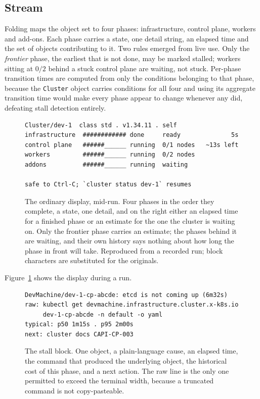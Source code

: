 \documentclass[conference]{IEEEtran}
\begin{document}
\subsection{Stream}
\label{sec:stream}

Folding maps the object set to four phases: infrastructure, control plane, workers
and add-ons. Each phase carries a state, one detail string, an elapsed time and
the set of objects contributing to it. Two rules emerged from live use. Only the
\emph{frontier} phase, the earliest that is not done, may be marked stalled;
workers sitting at $0/2$ behind a stuck control plane are waiting, not stuck.
Per-phase transition times are computed from only the conditions belonging to that
phase, because the \texttt{Cluster} object carries conditions for all four and
using its aggregate transition time would make every phase appear to change
whenever any did, defeating stall detection entirely.

\begin{figure}[t]
\begin{lstlisting}
Cluster/dev-1  class std . v1.34.11 . self
infrastructure  ############ done     ready              5s
control plane   ######______ running  0/1 nodes   ~13s left
workers         ######______ running  0/2 nodes
addons          ######______ running  waiting

safe to Ctrl-C; `cluster status dev-1` resumes
\end{lstlisting}
\caption{The ordinary display, mid-run. Four phases in the order they complete, a
state, one detail, and on the right either an elapsed time for a finished phase or
an estimate for the one the cluster is waiting on. Only the frontier phase carries
an estimate; the phases behind it are waiting, and their own history says nothing
about how long the phase in front will take. Reproduced from a recorded run;
block characters are substituted for the originals.}
\label{fig:phases}
\end{figure}

Figure~\ref{fig:phases} shows the display during a run.

\begin{figure}[t]
\begin{lstlisting}
DevMachine/dev-1-cp-abcde: etcd is not coming up (6m32s)
raw: kubectl get devmachine.infrastructure.cluster.x-k8s.io
     dev-1-cp-abcde -n default -o yaml
typical: p50 1m15s . p95 2m00s
next: cluster docs CAPI-CP-003
\end{lstlisting}
\caption{The stall block. One object, a plain-language cause, an elapsed time, the
command that produced the underlying object, the historical cost of this phase,
and a next action. The raw line is the only one permitted to exceed the terminal
width, because a truncated command is not copy-pasteable.}
\label{fig:stall}
\end{figure}
\end{document}

